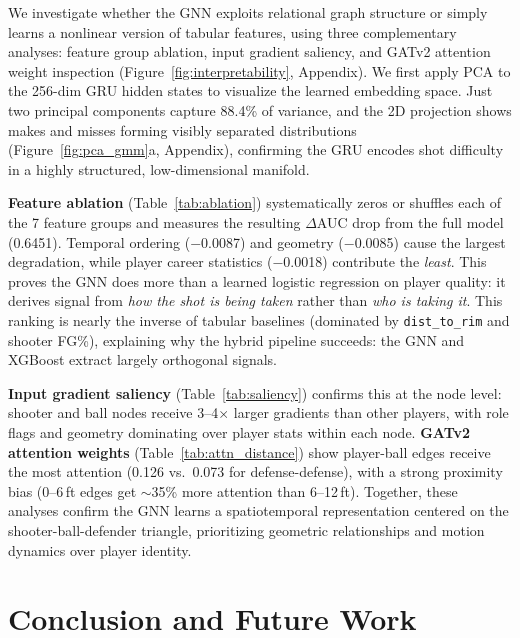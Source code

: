 \documentclass{article}
\begin{document}
We investigate whether the GNN exploits relational graph structure or simply learns a nonlinear version of tabular features, using three complementary analyses: feature group ablation, input gradient saliency, and GATv2 attention weight inspection (Figure~\ref{fig:interpretability}, Appendix). We first apply PCA to the 256-dim GRU hidden states to visualize the learned embedding space. Just two principal components capture 88.4\% of variance, and the 2D projection shows makes and misses forming visibly separated distributions (Figure~\ref{fig:pca_gmm}a, Appendix), confirming the GRU encodes shot difficulty in a highly structured, low-dimensional manifold.

\textbf{Feature ablation} (Table~\ref{tab:ablation}) systematically zeros or shuffles each of the 7 feature groups and measures the resulting $\Delta$AUC drop from the full model (0.6451). Temporal ordering ($-$0.0087) and geometry ($-$0.0085) cause the largest degradation, while player career statistics ($-$0.0018) contribute the \emph{least}. This proves the GNN does more than a learned logistic regression on player quality: it derives signal from \emph{how the shot is being taken} rather than \emph{who is taking it}. This ranking is nearly the inverse of tabular baselines (dominated by \texttt{dist\_to\_rim} and shooter FG\%), explaining why the hybrid pipeline succeeds: the GNN and XGBoost extract largely orthogonal signals.

\textbf{Input gradient saliency} (Table~\ref{tab:saliency}) confirms this at the node level: shooter and ball nodes receive 3--4$\times$ larger gradients than other players, with role flags and geometry dominating over player stats within each node. \textbf{GATv2 attention weights} (Table~\ref{tab:attn_distance}) show player-ball edges receive the most attention (0.126 vs.\ 0.073 for defense-defense), with a strong proximity bias (0--6\,ft edges get $\sim$35\% more attention than 6--12\,ft). Together, these analyses confirm the GNN learns a spatiotemporal representation centered on the shooter-ball-defender triangle, prioritizing geometric relationships and motion dynamics over player identity.

\section{Conclusion and Future Work}
\end{document}
